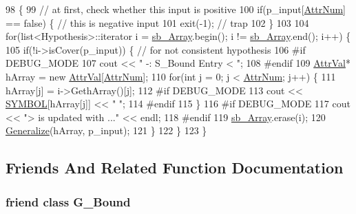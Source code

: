 \begin{DoxyCode}
98                                        \{
99     \textcolor{comment}{// at first, check whether this input is positive}
100     \textcolor{keywordflow}{if}(p\_input[\hyperlink{class_s___bound_a04cdddc7f5a38bb02bc8a706c275298f}{AttrNum}] == \textcolor{keyword}{false}) \{ \textcolor{comment}{// this is negative input}
101     exit(-1);           \textcolor{comment}{// trap}
102     \}
103     
104     \textcolor{keywordflow}{for}(list<Hypothesis>::iterator i = \hyperlink{class_s___bound_a06e45530f4b7a999dfaa17ca73ef1d4f}{sb\_Array}.begin(); i != \hyperlink{class_s___bound_a06e45530f4b7a999dfaa17ca73ef1d4f}{sb\_Array}.end(); i++) \{
105     \textcolor{keywordflow}{if}(!i->isCover(p\_input)) \{  \textcolor{comment}{// for not consistent hypothesis}
106 \textcolor{preprocessor}{#if DEBUG\_MODE}
107 \textcolor{preprocessor}{}        cout << \textcolor{stringliteral}{" -: S\_Bound Entry < "};
108 \textcolor{preprocessor}{#endif}
109 \textcolor{preprocessor}{}        \hyperlink{concept_8h_a9680d29b8d997e4adbf99481b65e897d}{AttrVal}* hArray = \textcolor{keyword}{new} \hyperlink{concept_8h_a9680d29b8d997e4adbf99481b65e897d}{AttrVal}[\hyperlink{class_s___bound_a04cdddc7f5a38bb02bc8a706c275298f}{AttrNum}];
110         \textcolor{keywordflow}{for}(\textcolor{keywordtype}{int} j = 0; j < \hyperlink{class_s___bound_a04cdddc7f5a38bb02bc8a706c275298f}{AttrNum}; j++) \{
111         hArray[j] = i->GethArray()[j];
112 \textcolor{preprocessor}{#if DEBUG\_MODE}
113 \textcolor{preprocessor}{}        cout << \hyperlink{concept_8cpp_a6a0fcd5aed2dc21ce5f79cbe7c3a8e2f}{SYMBOL}[hArray[j]] << \textcolor{stringliteral}{" "};
114 \textcolor{preprocessor}{#endif      }
115 \textcolor{preprocessor}{}        \}
116 \textcolor{preprocessor}{#if DEBUG\_MODE}
117 \textcolor{preprocessor}{}        cout << \textcolor{stringliteral}{"> is updated with ..."} << endl;
118 \textcolor{preprocessor}{#endif}
119 \textcolor{preprocessor}{}        \hyperlink{class_s___bound_a06e45530f4b7a999dfaa17ca73ef1d4f}{sb\_Array}.erase(i);
120         \hyperlink{class_s___bound_ae266bf5fa4d70959ce3b33ebe2d13dfa}{Generalize}(hArray, p\_input);
121     \}
122     \}
123 \}
\end{DoxyCode}


\subsection{Friends And Related Function Documentation}
\hypertarget{class_s___bound_ada6e422609483cdffa32ad88125d9f0d}{
\subsubsection[{G\-\_\-\-Bound}]{\setlength{\rightskip}{0pt plus 5cm}friend class {\bf G\-\_\-\-Bound}\hspace{0.3cm}{\ttfamily [friend]}}}\label{class_s___bound_ada6e422609483cdffa32ad88125d9f0d}


